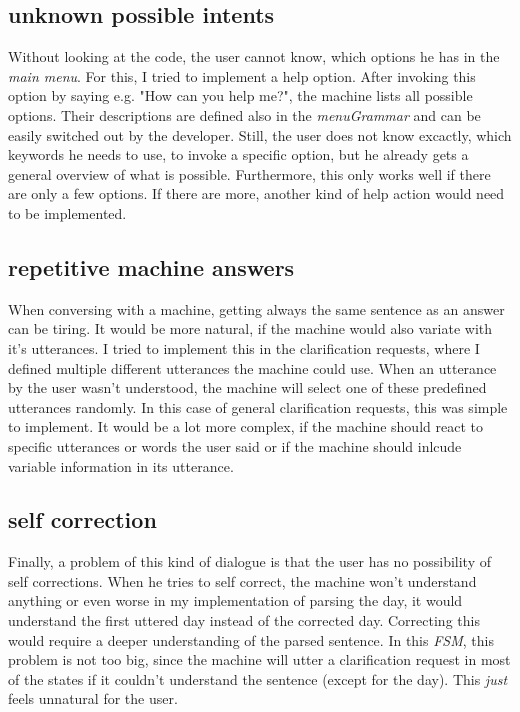 \documentclass[
	11pt, %
]{fphw}
\begin{document}
\subsection*{unknown possible intents}
Without looking at the code, the user cannot know, which options he has in the \emph{main menu}.
For this, I tried to implement a help option. After invoking this option by saying e.g. "How can 
you help me?", the machine lists all possible options. Their descriptions are defined also in 
the \emph{menuGrammar} and can be easily switched out by the developer. Still, the user does not 
know excactly, which keywords he needs to use, to invoke a specific option, but he already gets
a general overview of what is possible. Furthermore, this only works well if there are only a few 
options. If there are more, another kind of help action would need to be implemented.

\subsection*{repetitive machine answers}
When conversing with a machine, getting always the same sentence as an answer can be tiring.
It would be more natural, if the machine would also variate with it's utterances. I tried to 
implement this in the clarification requests, where I defined multiple different utterances the 
machine could use. When an utterance by the user wasn't understood, the machine will select one 
of these predefined utterances randomly. In this case of general clarification requests,
this was simple to implement. It would be a lot more complex, if the machine should react to 
specific utterances or words the user said or if the machine should inlcude variable information 
in its utterance.


\subsection*{self correction}
Finally, a problem of this kind of dialogue is that the user has no possibility of self corrections.
When he tries to self correct, the machine won't understand anything or even worse in my 
implementation of parsing the day, it would understand the first uttered day instead of the 
corrected day. Correcting this would require a deeper understanding of the parsed sentence.
In this \emph{FSM}, this problem is not too big, since the machine will utter a clarification 
request in most of the states if it couldn't understand the sentence (except for the day).
This \emph{just} feels unnatural for the user.
\end{document}
